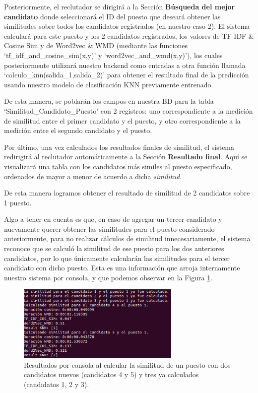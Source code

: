 \documentclass[12pt,a4paper]{article}
\begin{document}
\begin{sloppypar}
Posteriormente, el reclutador se dirigirá a la Sección \textbf{Búsqueda del mejor candidato} donde seleccionará el ID del puesto que deseará obtener las similitudes sobre todos los candidatos registrados (en nuestro caso 2). El sistema calculará para este puesto y los 2 candidatos registrados, los valores de TF-IDF \& Cosine Sim y de Word2vec \& WMD (mediante las funciones ‘tf\_idf\_and\_cosine\_sim(x,y)’ y ‘word2vec\_and\_wmd(x,y)’), los cuales posteriormente utilizará nuestro backend como entradas a otra función llamada ‘calculo\_knn(salida\_1,salida\_2)’ para obtener el resultado final de la predicción usando nuestro modelo de clasificación KNN previamente entrenado. 

De esta manera, se poblarán los campos en nuestra BD para la tabla ‘Similitud\_Candidato\_Puesto’ con 2 registros: uno correspondiente a la medición de similitud entre el primer candidato y el puesto, y otro correspondiente a la medición entre el segundo candidato y el puesto. 

Por último, una vez calculados los resultados finales de similitud, el sistema redirigirá al reclutador automáticamente a la Sección \textbf{Resultado final}. Aquí se visualizará una tabla con los candidatos más similes al puesto especificado, ordenados de mayor a menor de acuerdo a dicha \textit{similitud}. 

De esta manera logramos obtener el resultado de similitud de 2 candidatos sobre 1 puesto.

Algo a tener en cuenta es que, en caso de agregar un tercer candidato y nuevamente querer obtener las similitudes para el puesto considerado anteriormente, para no realizar cálculos de similitud innecesariamente, el sistema reconoce que se calculó la similitud de ese puesto para los dos anteriores candidatos, por lo que únicamente calcularán las similitudes para el tercer candidato con dicho puesto. Esta es una información que arroja internamente nuestro sistema por consola, y que podemos observar en la Figura \ref{fig:similitudes_calculadas}.

\begin{figure}[H]  
\centering
\includegraphics[width=0.7\textwidth]{images/implementacion_web/similitudes_calculadas.png}
\captionsetup{justification=centering,margin=2cm}
\caption{Resultados por consola al calcular la similitud de un puesto con dos candidatos nuevos (candidatos 4 y 5) y tres ya calculados (candidatos 1, 2 y 3).}
\label{fig:similitudes_calculadas}
\end{figure}


\end{sloppypar}
\end{document}
